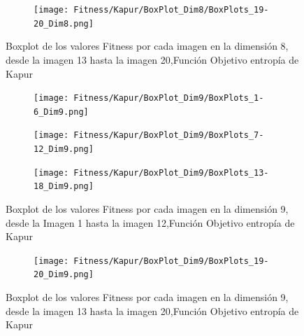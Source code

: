\documentclass[conference]{IEEEtran}
\begin{document}
\begin{figure}
    \centering
    \begin{subfigure}{0.5\textwidth}
        \texttt{[image: Fitness/Kapur/BoxPlot\_Dim8/BoxPlots\_19-20\_Dim8.png]}
        \vspace{-150pt} %
    \end{subfigure}
    \caption{Boxplot de los valores Fitness por cada imagen en la dimensión 8, desde la imagen 13 hasta la imagen 20,Función Objetivo entropía de Kapur}
    \label{fig:imagenes}    
\end{figure}
\begin{figure}
    \centering

    \begin{subfigure}{0.5\textwidth}
        \texttt{[image: Fitness/Kapur/BoxPlot\_Dim9/BoxPlots\_1-6\_Dim9.png]}
    \end{subfigure}
    
    \begin{subfigure}{0.5\textwidth}
        \texttt{[image: Fitness/Kapur/BoxPlot\_Dim9/BoxPlots\_7-12\_Dim9.png]}
    \end{subfigure}
         \begin{subfigure}{0.5\textwidth}
        \texttt{[image: Fitness/Kapur/BoxPlot\_Dim9/BoxPlots\_13-18\_Dim9.png]}
    \end{subfigure}
    \caption{Boxplot de los valores Fitness por cada imagen en la dimensión 9, desde la Imagen 1 hasta la imagen 12,Función Objetivo entropía de Kapur}
\label{fig:imagenes}    
\end{figure}

\begin{figure}
    \centering
    \begin{subfigure}{0.5\textwidth}
        \texttt{[image: Fitness/Kapur/BoxPlot\_Dim9/BoxPlots\_19-20\_Dim9.png]}
        \vspace{-1pt} %
    \end{subfigure}
    \caption{Boxplot de los valores Fitness por cada imagen en la dimensión 9, desde la imagen 13 hasta la imagen 20,Función Objetivo entropía de Kapur}
    \label{fig:imagenes}    
\end{figure}

\end{document}
